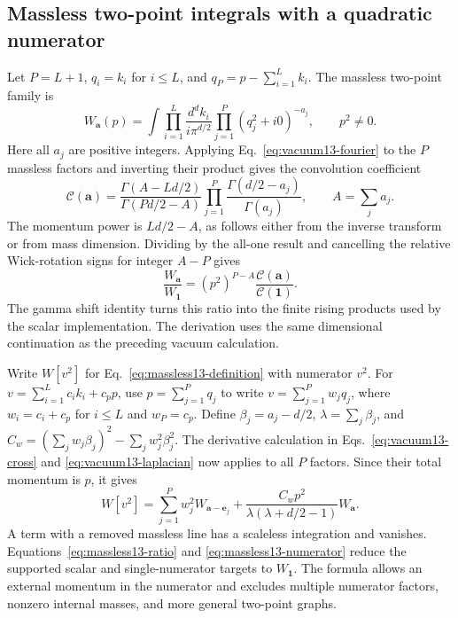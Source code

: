 \subsection{Massless two-point integrals with a quadratic numerator}
Let $P=L+1$, $q_i=k_i$ for $i\leq L$, and $q_P=p-\sum_{i=1}^Lk_i$. The massless two-point family is
\begin{equation}
 W_{\boldsymbol a}(p)=\int\prod_{i=1}^L\frac{d^dk_i}{i\pi^{d/2}}
 \prod_{j=1}^{P}(q_j^2+i0)^{-a_j},\qquad p^2\ne0.
 \label{eq:massless13-definition}
\end{equation}
Here all $a_j$ are positive integers. Applying Eq.~\eqref{eq:vacuum13-fourier} to the $P$ massless factors and inverting their product gives the convolution coefficient
\begin{equation}
 \mathcal C(\boldsymbol a)=
 \frac{\Gamma(A-Ld/2)}{\Gamma(Pd/2-A)}
 \prod_{j=1}^P\frac{\Gamma(d/2-a_j)}{\Gamma(a_j)},\qquad A=\sum_j a_j.
 \label{eq:massless13-gamma}
\end{equation}
The momentum power is $Ld/2-A$, as follows either from the inverse transform or from mass dimension. Dividing by the all-one result and cancelling the relative Wick-rotation signs for integer $A-P$ gives
\begin{equation}
 \frac{W_{\boldsymbol a}}{W_{\boldsymbol 1}}=
 (p^2)^{P-A}\frac{\mathcal C(\boldsymbol a)}{\mathcal C(\boldsymbol 1)}.
 \label{eq:massless13-ratio}
\end{equation}
The gamma shift identity turns this ratio into the finite rising products used by the scalar implementation. The derivation uses the same dimensional continuation as the preceding vacuum calculation.

Write $W[v^2]$ for Eq.~\eqref{eq:massless13-definition} with numerator $v^2$. For $v=\sum_{i=1}^Lc_i k_i+c_p p$, use $p=\sum_{j=1}^Pq_j$ to write $v=\sum_{j=1}^Pw_jq_j$, where $w_i=c_i+c_p$ for $i\leq L$ and $w_P=c_p$. Define $\beta_j=a_j-d/2$, $\lambda=\sum_j\beta_j$, and $C_w=(\sum_jw_j\beta_j)^2-\sum_jw_j^2\beta_j^2$. The derivative calculation in Eqs.~\eqref{eq:vacuum13-cross} and \eqref{eq:vacuum13-laplacian} now applies to all $P$ factors. Since their total momentum is $p$, it gives
\begin{equation}
 W[v^2]=\sum_{j=1}^Pw_j^2W_{\boldsymbol a-\boldsymbol e_j}
 +\frac{C_w p^2}{\lambda(\lambda+d/2-1)}W_{\boldsymbol a}.
 \label{eq:massless13-numerator}
\end{equation}
A term with a removed massless line has a scaleless integration and vanishes. Equations~\eqref{eq:massless13-ratio} and \eqref{eq:massless13-numerator} reduce the supported scalar and single-numerator targets to $W_{\boldsymbol 1}$. The formula allows an external momentum in the numerator and excludes multiple numerator factors, nonzero internal masses, and more general two-point graphs.
